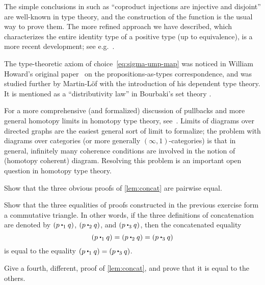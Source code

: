 The simple conclusions in  such as ``coproduct injections are injective and disjoint'' are well-known in type theory, and the construction of the function \encode is the usual way to prove them.
The more refined approach we have described, which characterizes the entire identity type of a positive type (up to equivalence), is a more recent development; see e.g.~\cite{ls:pi1s1}.

%
The type-theoretic axiom of choice~\eqref{eq:sigma-ump-map} was noticed in William Howard's original paper~\cite{howard:pat} on the propositions-as-types correspondence, and was studied further by Martin-L\"of with the introduction of his dependent type theory.  It is mentioned as a ``distributivity law'' in Bourbaki's set theory \cite{Bourbaki}.

For a more comprehensive (and formalized) discussion of pullbacks and more general homotopy limits in homotopy type theory, see~\cite{AKL13}.
Limits of diagrams over directed graphs are the easiest general sort of limit to formalize; the problem with diagrams over categories (or more generally $(\infty,1)$-categories) is that in general, infinitely many coherence conditions are involved in the notion of (homotopy coherent) diagram.
Resolving this problem is an important open question in homotopy type theory.

\sectionExercises

\begin{ex}\label{ex:basics:concat}
  Show that the three obvious proofs of \autoref{lem:concat} are pairwise equal.
\end{ex}

\begin{ex}
  Show that the three equalities of proofs constructed in the previous exercise form a commutative triangle.
  In other words, if the three definitions of concatenation are denoted by $(p \mathbin{\ct_1} q)$, $(p\mathbin{\ct_2} q)$, and $(p\mathbin{\ct_3} q)$, then the concatenated equality
  \[(p\mathbin{\ct_1} q) = (p\mathbin{\ct_2} q) = (p\mathbin{\ct_3} q)\]
  is equal to the equality $(p\mathbin{\ct_1} q) = (p\mathbin{\ct_3} q)$.
\end{ex}

\begin{ex}
  Give a fourth, different, proof of \autoref{lem:concat}, and prove that it is equal to the others.
\end{ex}

